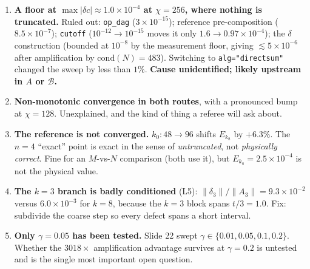\documentclass[11pt,a4paper]{article}
\begin{document}
\begin{enumerate}
\item\textbf{A floor at $\max|\delta c|\approx1.0\times10^{-4}$ at $\chi=256$, where nothing is
truncated.} Ruled out: \texttt{op\_dag} ($3\times10^{-15}$); reference pre-composition
($8.5\times10^{-7}$); \texttt{cutoff} ($10^{-12}\to10^{-15}$ moves it only
$1.6\to0.97\times10^{-4}$); the $\delta$ construction (bounded at $10^{-8}$ by the measurement
floor, giving ${\lesssim}5\times10^{-6}$ after amplification by $\mathrm{cond}(N)=483$).
Switching to \texttt{alg="directsum"} changed the sweep by less than $1\%$. \textbf{Cause
unidentified; likely upstream in $A$ or $\mathcal{B}$.}

\item\textbf{Non-monotonic convergence in both routes}, with a pronounced bump at $\chi=128$.
Unexplained, and the kind of thing a referee will ask about.

\item\textbf{The reference is not converged.} $k_0:48\to96$ shifts $E_{k_8}$ by $+6.3\%$. The
$n=4$ ``exact'' point is exact in the sense of \emph{untruncated}, not \emph{physically
correct}. Fine for an $M$-vs-$N$ comparison (both use it), but $E_{k_8}=2.5\times10^{-4}$ is not
the physical value.

\item\textbf{The $k=3$ branch is badly conditioned} (L5): $\|\delta_3\|/\|A_3\|=9.3\times10^{-2}$
versus $6.0\times10^{-3}$ for $k=8$, because the $k=3$ block spans $t/3=1.0$. Fix: subdivide the
coarse step so every defect spans a short interval.

\item\textbf{Only $\gamma=0.05$ has been tested.} Slide 22 swept
$\gamma\in\{0.01,0.05,0.1,0.2\}$. Whether the $3018\times$ amplification advantage survives at
$\gamma=0.2$ is untested and is the single most important open question.
\end{enumerate}
\end{document}
